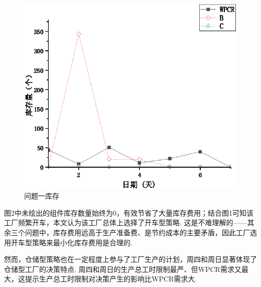 \begin{figure}[!htbp]
	\centering
	\includegraphics{Image/问题一库存.eps}
	\caption{问题一库存}\label{问题一库存}
\end{figure}

图2中未绘出的组件库存数量始终为0，有效节省了大量库存费用；结合图1可知该工厂频繁开车，本文认为该工厂总体上选择了开车型策略.
这是不难理解的——其余三个问题中，库存费用远高于生产准备费、是节约成本的主要矛盾，因此工厂选用开车型策略来最小化库存费用是合理的.

然而，仓储型策略也在一定程度上参与了工厂生产的计划，周四和周日显著体现了仓储型工厂的决策特点.
周四和周日的生产总工时限制最严、但WPCR需求又最大，这提示生产总工时限制对决策产生的影响比WPCR需求大.








